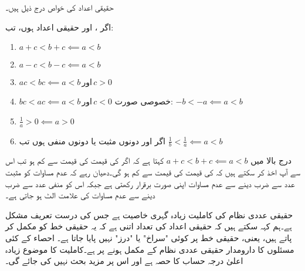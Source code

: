 حقیقی اعداد کی خواص درج ذیل ہیں۔\\
\begin{mdframed}[frametitlerulewidth=10pt,frametitle={قواعد برائے عدم مساوات}]

اگر ،  اور  حقیقی اعداد ہوں، تب:
\begin{enumerate}[1.]
\item
$a+c<b+c\impliedby a<b$
\item
$a-c<b-c\impliedby a<b$
\item
$ac<bc\impliedby a<b \,\text{اور}\, c>0$
\item
$bc<ac\impliedby a<b\, \text{اور}\, c<0$\quad 
خصوصی صورت:
$-b<-a\impliedby a<b$
\item
$\frac{1}{a}>0\impliedby a>0$
\item
اگر  اور  دونوں مثبت یا دونوں منفی ہوں تب 
$\frac{1}{b}<\frac{1}{a}\impliedby a<b$
\end{enumerate}
\end{mdframed}
درج بالا میں $a+c<b+c\impliedby a<b$ کہتا ہے کہ اگر  کی قیمت  کی قیمت سے کم ہو تب اس سے آپ اخذ کر سکتے ہیں کہ  کی قیمت  کی قیمت سے کم ہو گی۔دھیان رہے کہ عدم مساوات کو مثبت عدد سے ضرب دینے سے عدم مساوات اپنی صورت برقرار رکھتی ہے جبکہ اس کو منفی عدد سے ضرب دینے سے عدم مساوات کی علامت الٹ ہو جاتی ہے۔ 

حقیقی عددی نظام کی کاملیت زیادہ گہری خاصیت ہے جس کی درست تعریف مشکل ہے۔ہم کہہ سکتے ہیں کہ حقیقی اعداد کی تعداد اتنی ہے کہ یہ حقیقی خط کو مکمل کر پاتے ہیں، یعنی، حقیقی خط پر کوئی "سراخ" یا "درز" نہیں پایا جاتا ہے۔ احصاء کے کئی مسئلوں کا دارومدار حقیقی عددی نظام کے مکمل ہونے پر ہے۔کاملیت کا موضوع زیادہ اعلیٰ درجہ حساب کا حصہ ہے اور اس پر مزید بحث نہیں کی جائے گی۔  

